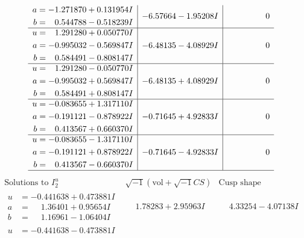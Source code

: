 \documentclass[1p]{elsarticle_modified}
\theoremstyle{definition}
\newcommand{\I}{\sqrt{-1}}
\begin{document}
$$\begin{array}{c|c|c}
\begin{aligned}
a &= -1.271870 + 0.131954 I \\
b &= \phantom{-}0.544788 - 0.518239 I\end{aligned}
 & -6.57664 - 1.95208 I & \phantom{-0.000000 } 0 \\ \hline\begin{aligned}
u &= \phantom{-}1.291280 + 0.050770 I \\
a &= -0.995032 - 0.569847 I \\
b &= \phantom{-}0.584491 - 0.808147 I\end{aligned}
 & -6.48135 - 4.08929 I & \phantom{-0.000000 } 0 \\ \hline\begin{aligned}
u &= \phantom{-}1.291280 - 0.050770 I \\
a &= -0.995032 + 0.569847 I \\
b &= \phantom{-}0.584491 + 0.808147 I\end{aligned}
 & -6.48135 + 4.08929 I & \phantom{-0.000000 } 0 \\ \hline\begin{aligned}
u &= -0.083655 + 1.317110 I \\
a &= -0.191121 - 0.878922 I \\
b &= \phantom{-}0.413567 + 0.660370 I\end{aligned}
 & -0.71645 + 4.92833 I & \phantom{-0.000000 } 0 \\ \hline\begin{aligned}
u &= -0.083655 - 1.317110 I \\
a &= -0.191121 + 0.878922 I \\
b &= \phantom{-}0.413567 - 0.660370 I\end{aligned}
 & -0.71645 - 4.92833 I & \phantom{-0.000000 } 0\\
 \hline 
 \end{array}$$\newpage$$\begin{array}{c|c|c}  
\text{Solutions to }I^u_{2}& \I (\text{vol} + \sqrt{-1}CS) & \text{Cusp shape}\\
 \hline 
\begin{aligned}
u &= -0.441638 + 0.473881 I \\
a &= \phantom{-}1.36401 + 0.95654 I \\
b &= \phantom{-}1.16961 - 1.06404 I\end{aligned}
 & \phantom{-}1.78283 + 2.95963 I & \phantom{-}4.33254 - 4.07138 I \\ \hline\begin{aligned}
u &= -0.441638 - 0.473881 I \\

\end{aligned}
\end{array}$$
\end{document}

